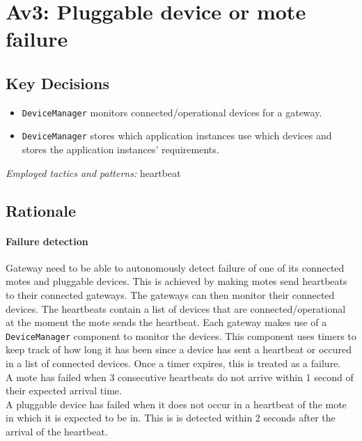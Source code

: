 \section{Av3: Pluggable device or mote failure}

    \subsection*{Key Decisions}

    \begin{itemize}
    	\item \texttt{DeviceManager} monitors connected/operational devices for a gateway.
    	\item \texttt{DeviceManager} stores which application instances use which devices and stores the application instances' requirements.
    \end{itemize}
    \emph{Employed tactics and patterns:} heartbeat

    \subsection*{Rationale}
        \paragraph{Failure detection}
            Gateway need to be able to autonomously detect failure of one of its
            connected motes and pluggable devices. This is achieved by making motes
            send heartbeats to their connected gateways. The gateways can
            then monitor their connected devices. The heartbeats contain a list
            of devices that are connected/operational at the moment the mote sends
            the heartbeat. Each gateway makes use of a \texttt{DeviceManager}
            component to monitor the devices. This component uses timers to keep track
            of how long it has been since a device has sent a heartbeat or occured in
            a list of connected devices. Once a timer expires, this is treated as
            a failure. \\

            A mote has failed when 3 consecutive heartbeats do not arrive within 1
            second of their expected arrival time. \\
            A pluggable device has failed when it does not occur in a heartbeat of the
            mote in which it is expected to be in. This is is detected within 2
            seconds after the arrival of the heartbeat.

